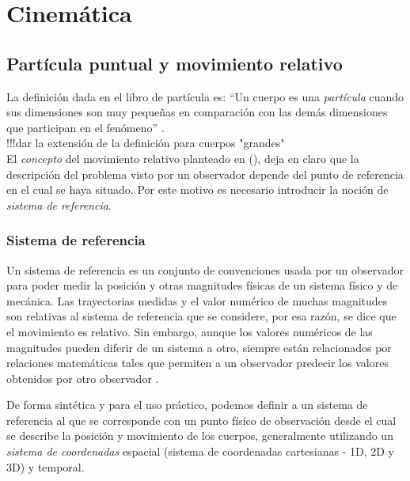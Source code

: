 


\chapter{Cinemática}

\section{Partícula puntual y movimiento relativo}
\label{c.pmr}

La definición dada en el libro de partícula es: ``Un cuerpo es una
\emph{partícula} cuando sus dimensiones son muy pequeñas en comparación con las
demás dimensiones que participan en el fenómeno'' \parencite[62]{alvarenga}.
\\

!!!dar la extensión de la definición para cuerpos "grandes"\\

El \textit{concepto} del movimiento relativo planteado en
\citeauthor{alvarenga} (\citeyear[62]{alvarenga}),
deja en claro que la descripción del problema visto por un observador depende
del punto de referencia en el cual se haya situado. Por este motivo es necesario
introducir la noción de \emph{sistema de referencia}.

\subsection{Sistema de referencia}
\label{c.sr}

Un sistema de referencia es un conjunto de convenciones usada por un observador
para poder medir la posición y otras magnitudes físicas de un sistema físico y
de mecánica. Las trayectorias medidas y el valor numérico de muchas magnitudes
son relativas al sistema de referencia que se considere, por esa razón, se dice
que el movimiento es relativo. Sin embargo, aunque los valores numéricos de las
magnitudes pueden diferir de un sistema a otro, siempre están relacionados por
relaciones matemáticas tales que permiten a un observador predecir los valores
obtenidos por otro observador \parencite{w:sr}.

De forma sintética y para el uso práctico, podemos definir a un sistema de
referencia al que se corresponde con un punto físico de observación desde el
cual se describe la posición y movimiento de los cuerpos, generalmente utilizando
un \emph{sistema de coordenadas} espacial (sistema de coordenadas cartesianas -
1D, 2D y 3D) y temporal.

